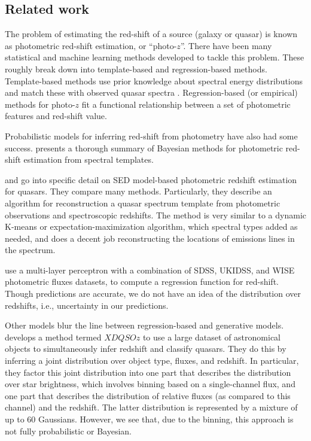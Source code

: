 \documentclass{article}
\begin{document}
\subsection{Related work}
The problem of estimating the red-shift of a source (galaxy or quasar) is known as photometric red-shift estimation, or
``photo-$z$''.  There have been many statistical and machine learning methods developed to tackle this problem. These roughly break down into template-based and regression-based methods. Template-based methods use prior knowledge about spectral energy distributions
and match these with observed quasar spectra \cite{walcher2011fitting}.  Regression-based (or empirical) methods for photo-$z$ fit a functional relationship between a set of photometric features and red-shift value.  

Probabilistic models for inferring red-shift from photometry have also had some success.  \cite{benitez2000bayesian} presents a thorough summary of Bayesian methods for photometric red-shift estimation from spectral templates.  

\cite{budavari2001photometric} and \cite{richards2001photometric} go into specific detail on SED
model-based photometric redshift estimation for quasars.  They compare many methods. Particularly, they describe an algorithm for reconstruction a quasar spectrum template from photometric observations and spectroscopic redshifts.  The method is very similar to a dynamic K-means or expectation-maximization
algorithm, which spectral types added as needed, and does a decent job reconstructing the locations
of emissions lines in the spectrum.

\cite{brescia2013photometric} use a multi-layer perceptron with a combination of SDSS, UKIDSS, and WISE photometric fluxes datasets, to compute a regression function for red-shift. Though predictions are accurate, we do not have an idea of the distribution over redshifts, i.e., uncertainty in our predictions.

Other models blur the line between regression-based and generative models.  \cite{bovy2012photometric} develops a method termed $XDQSOz$ to use a large dataset of astronomical objects to simultaneously infer redshift and classify quasars. They do this by inferring a joint distribution over object type, fluxes, and redshift. In particular, they factor this joint distribution
into one part that describes the distribution over star brightness, which involves binning based on a single-channel flux, and
one part that describes the distribution of relative fluxes (as compared to this channel) and the redshift. The latter distribution
is represented by a mixture of up to 60 Gaussians. However, we see that, due to the
binning, this approach is not fully probabilistic or Bayesian.
\end{document}
